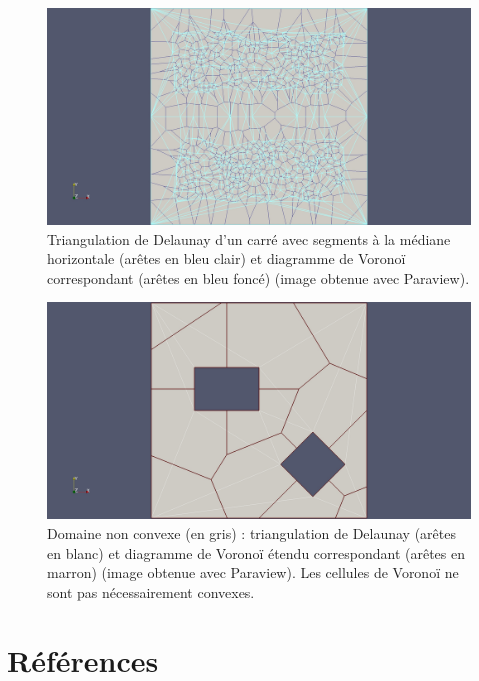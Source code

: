 \documentclass[12pt,a4paper]{report}
\begin{document}
\begin{figure}[htbp]
\begin{center}
\includegraphics[scale=0.35, viewport=530 0 1680 1129, clip]{del_vor.jpg}
\caption{Triangulation de Delaunay d'un carré avec segments à la médiane horizontale (arêtes en bleu clair) et diagramme de Voronoï correspondant (arêtes en bleu foncé) (image obtenue avec Paraview).}
\label{del_vor}
\end{center}
\end{figure}


\begin{center}
\begin{figure}[t]
\includegraphics[scale=0.35, viewport=530 0 1680 1129, clip]{sq_del_vor.jpg}
\caption{Domaine non convexe (en gris) : triangulation de Delaunay (arêtes en blanc) et diagramme de Voronoï étendu correspondant (arêtes en marron) (image obtenue avec Paraview). Les cellules de Voronoï ne sont pas nécessairement convexes.}
\label{sq_del_vor}
\end{figure}
\end{center}
\clearpage

\section{Références}
\vspace*{1cm}
\end{document}
